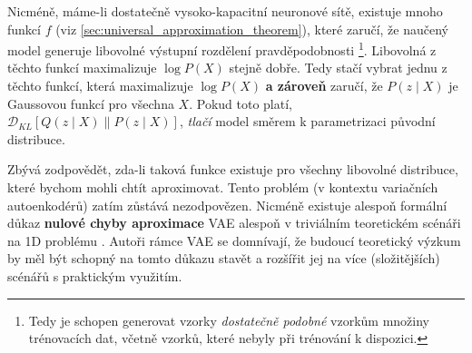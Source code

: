 Nicméně, máme-li dostatečně vysoko-kapacitní neuronové sítě, existuje mnoho funkcí $f$ (viz \autoref{sec:universal_approximation_theorem}), které zaručí, že naučený model generuje libovolné výstupní rozdělení pravděpodobnosti
\footnote{Tedy je schopen generovat vzorky \emph{dostatečně podobné} vzorkům množiny trénovacích dat, včetně vzorků, které nebyly při trénování k dispozici.}.
Libovolná z těchto funkcí maximalizuje $\log P(X)$ stejně dobře. Tedy stačí vybrat jednu z těchto funkcí, která maximalizuje $\log P(X)$ \textbf{a zároveň} zaručí, že $P (z\mid X)$ je Gaussovou funkcí pro všechna $X$.
Pokud toto platí, $\mathcal{D}_{KL}\left[ Q(z\mid X) \parallel P(z\mid X) \right]$, \emph{tlačí} model směrem k parametrizaci původní distribuce.

Zbývá zodpovědět, zda-li taková funkce existuje pro všechny libovolné distribuce, které bychom mohli chtít aproximovat.
Tento problém (v kontextu variačních autoenkodérů) zatím zůstává nezodpovězen. Nicméně existuje alespoň formální důkaz \textbf{nulové chyby aproximace} VAE alespoň v triviálním teoretickém scénáři na 1D problému \cite[Příloha A]{Doersch2021}.
Autoři rámce VAE se domnívají, že budoucí teoretický výzkum by měl být schopný na tomto důkazu stavět a rozšířit jej na více (složitějších) scénářů s praktickým využitím. 